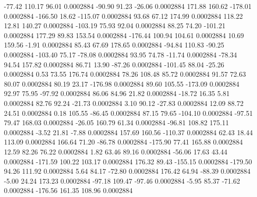       -77.42      110.17       96.01     0.0002884
      -90.90       91.23      -26.06     0.0002884
      171.88      160.62     -178.01     0.0002884
     -166.50       18.62     -115.07     0.0002884
       93.68       67.12      174.99     0.0002884
      118.22       12.81      140.27     0.0002884
     -103.19       75.93       92.04     0.0002884
       88.25       74.20     -101.21     0.0002884
      177.29       89.83      153.54     0.0002884
     -176.44      100.94      104.61     0.0002884
       10.69      159.56       -1.91     0.0002884
       85.43       67.69      178.65     0.0002884
      -94.84      110.83      -90.25     0.0002884
     -103.40       75.17      -78.08     0.0002884
       93.95       74.78      -11.74     0.0002884
      -78.34       94.54      157.82     0.0002884
       86.71       13.90      -87.26     0.0002884
     -101.45       88.04      -25.26     0.0002884
        0.53       73.55      176.74     0.0002884
       78.26      108.48       85.72     0.0002884
       91.57       72.63       80.07     0.0002884
       80.19       23.17     -176.98     0.0002884
       89.60      105.55     -173.09     0.0002884
       92.97       75.95      -97.92     0.0002884
       86.06       84.96       21.82     0.0002884
      -18.72       16.35        5.81     0.0002884
       82.76       92.24      -21.73     0.0002884
        3.10       90.12      -27.83     0.0002884
       12.09       88.72       24.51     0.0002884
        0.18      105.55      -86.45     0.0002884
       87.15       79.65     -104.10     0.0002884
      -97.51       79.47      168.03     0.0002884
      -26.05      160.79       61.34     0.0002884
      -96.81      108.82      175.11     0.0002884
       -3.52       21.81       -7.88     0.0002884
      157.69      160.56     -110.37     0.0002884
       62.43       18.44      113.09     0.0002884
      166.64       71.20      -86.78     0.0002884
     -175.90       77.41      165.88     0.0002884
       12.59       82.26       76.22     0.0002884
        1.82       63.46       89.16     0.0002884
      -56.06       17.63       43.44     0.0002884
     -171.59      100.22      103.17     0.0002884
      176.32       89.43     -155.15     0.0002884
     -179.50       94.26      111.92     0.0002884
        5.64       84.17      -72.80     0.0002884
      176.42       64.94      -88.39     0.0002884
       -5.00       24.24      173.23     0.0002884
      -97.18      109.47      -97.46     0.0002884
       -5.95       85.37      -71.62     0.0002884
     -176.56      161.35      108.96     0.0002884
